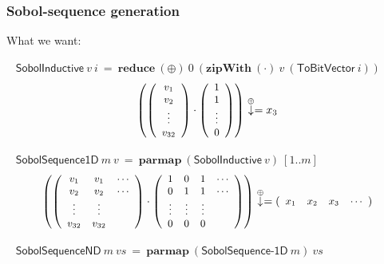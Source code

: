 \documentclass{beamer}
\begin{document}
\begin{frame}[fragile]
  \frametitle{Sobol-sequence generation}

What we want:

  ~\vspace{2mm}
  \quad$\mathsf{SobolInductive}~v~i~=~\textbf{reduce}~(\oplus)~0~(\textbf{zipWith}~(\cdot)~v~(\textsf{ToBitVector}~i))$
  \begin{equation*}\small
    \left(
  \left(\begin{array}{c}
    v_1 \\ v_2 \\ \vdots \\ v_{32}
  \end{array}\right)
  \cdot
  \left(\begin{array}{c}
    1 \\ 1 \\ \vdots \\ 0
  \end{array}\right) \right)
  \stackrel{\oplus}{\Large \downarrow}
  = x_3
  \end{equation*}


  ~\vspace{2mm}\pause  
  \quad$\mathsf{SobolSequence1D}~m~v~=~\textbf{parmap}~(\textsf{SobolInductive}~v)~[1..m]$
  \begin{equation*}\small
    \left(
  \left(\begin{array}{ccc}
    v_1 & v_1 & \cdots \\ 
    v_2 & v_2 & \cdots \\ 
    \vdots & \vdots &  \\
    v_{32} & v_{32} &  \\
  \end{array}\right)
  \cdot
  \left(\begin{array}{cccc}
    1 & 0 & 1 & \cdots \\
    0  & 1 & 1 & \cdots \\
    \vdots & \vdots & \vdots &  \\
    0 & 0 & 0 &  \\
  \end{array}\right) \right)
  \stackrel{\oplus}{\Large \downarrow}
  =   \left(\begin{array}{cccc}
    x_1 & x_2 & x_3 & \cdots \\
  \end{array}\right)
  \end{equation*}


  ~\vspace{2mm}\pause
  \quad$\mathsf{SobolSequenceND}~m~vs~=~\textbf{parmap}~(\textsf{SobolSequence-1D}~m)~vs$


\end{frame}
\end{document}
